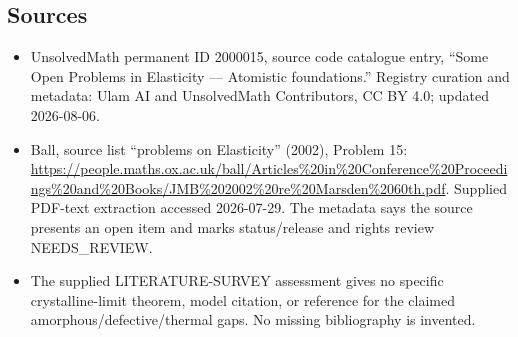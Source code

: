 \documentclass[11pt]{article}
\begin{document}
\subsection{Sources}
\begin{itemize}
\item UnsolvedMath permanent ID 2000015, source code catalogue entry, ``Some Open Problems in Elasticity --- Atomistic foundations.'' Registry curation and metadata: Ulam AI and UnsolvedMath Contributors, CC BY 4.0; updated 2026-08-06.
\item Ball, source list ``problems on Elasticity'' (2002), Problem 15: \url{https://people.maths.ox.ac.uk/ball/Articles%20in%20Conference%20Proceedings%20and%20Books/JMB%202002%20re%20Marsden%2060th.pdf}. Supplied PDF-text extraction accessed 2026-07-29. The metadata says the source presents an open item and marks status/release and rights review NEEDS\_REVIEW.
\item The supplied LITERATURE-SURVEY assessment gives no specific crystalline-limit theorem, model citation, or reference for the claimed amorphous/defective/thermal gaps. No missing bibliography is invented.
\end{itemize}
\end{document}
